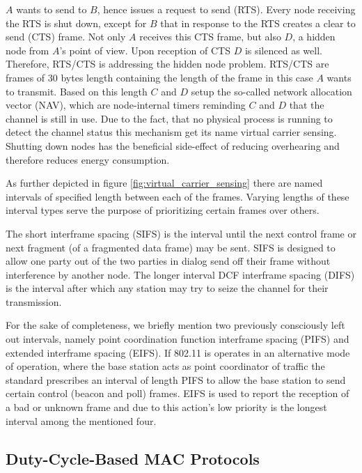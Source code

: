 $A$ wants to send to $B$, hence issues a request to send (RTS). Every node receiving the RTS is shut down, except for $B$ that in response to the RTS creates a clear to send (CTS) frame. Not only $A$ receives this CTS frame, but also $D$, a hidden node from $A$'s point of view. Upon reception of CTS $D$ is silenced as well. Therefore, RTS/CTS is addressing the hidden node problem. RTS/CTS are frames of 30 bytes length containing the length of the frame in this case $A$ wants to transmit. Based on this length $C$ and $D$ setup the so-called network allocation vector (NAV), which are node-internal timers reminding $C$ and $D$ that the channel is still in use. Due to the fact, that no physical process is running to detect the channel status this mechanism get its name virtual carrier sensing. Shutting down nodes has the beneficial side-effect of reducing overhearing and therefore reduces energy consumption.

As further depicted in figure \ref{fig:virtual_carrier_sensing} there are named intervals of specified length between each of the frames. Varying lengths of these interval types serve the purpose of prioritizing certain frames over others. 

The short interframe spacing (SIFS) is the interval until the next control frame or next fragment (of a fragmented data frame) may be sent. SIFS is designed to allow one party out of the two parties in dialog send off their frame without interference by another node. The longer interval DCF interframe spacing (DIFS) is the interval after which any station may try to seize the channel for their transmission.

For the sake of completeness, we briefly mention two previously consciously left out intervals, namely point coordination function interframe spacing (PIFS) and extended interframe spacing (EIFS). If 802.11 is operates in an alternative mode of operation, where the base station acts as point coordinator of traffic the standard prescribes an interval of length PIFS to allow the base station to send certain control (beacon and poll) frames. EIFS is used to report the reception of a bad or unknown frame and due to this action's low priority is the longest interval among the mentioned four. 

\subsection{Duty-Cycle-Based MAC Protocols} \label{sec:duty-cycle-mac}  

